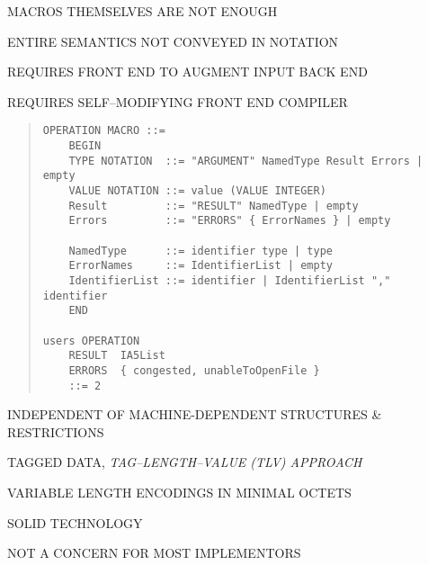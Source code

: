 \begin{bwslide}

\begin{nrtc}
\item	MACROS THEMSELVES ARE NOT ENOUGH
	\begin{nrtc}
	\item	ENTIRE SEMANTICS NOT CONVEYED IN NOTATION
	\item	REQUIRES FRONT END TO AUGMENT INPUT BACK END
	\end{nrtc}
\item	REQUIRES SELF--MODIFYING FRONT END COMPILER
\end{nrtc}
\end{bwslide}


\begin{bwslide}
\begin{quote}\small\begin{verbatim}
OPERATION MACRO ::=
    BEGIN
    TYPE NOTATION  ::= "ARGUMENT" NamedType Result Errors | empty
    VALUE NOTATION ::= value (VALUE INTEGER)
    Result         ::= "RESULT" NamedType | empty
    Errors         ::= "ERRORS" { ErrorNames } | empty
    
    NamedType      ::= identifier type | type
    ErrorNames     ::= IdentifierList | empty
    IdentifierList ::= identifier | IdentifierList "," identifier
    END

users OPERATION
    RESULT	IA5List
    ERRORS	{ congested, unableToOpenFile }
    ::= 2
\end{verbatim}\end{quote}
\end{bwslide}


%    
%


\begin{bwslide}

\begin{nrtc}
\item	INDEPENDENT OF MACHINE-DEPENDENT STRUCTURES \& RESTRICTIONS
\item	TAGGED DATA, {\em TAG--LENGTH--VALUE (TLV) APPROACH}
\item	VARIABLE LENGTH ENCODINGS IN MINIMAL OCTETS
\item	SOLID TECHNOLOGY
	\begin{nrtc}
	\item	NOT A CONCERN FOR MOST IMPLEMENTORS
	\end{nrtc}
\end{nrtc}
\end{bwslide}


